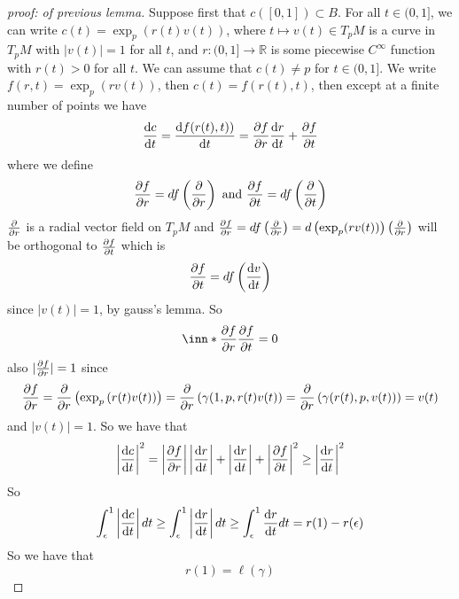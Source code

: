 \documentclass[a4paper]{article}
\begin{document}
\begin{proof}[proof: of previous lemma]
  Suppose first that $c([0,1]) \subset B$. For all $t \in (0,1]$, we can write $c(t) = \exp_p(r(t)v(t))$, where $t \mapsto v(t) \in T_pM$ is a curve in $T_pM$ with $|v(t)| = 1$ for all $t$, and $r: (0,1] \rightarrow \mathds{R}$ is some piecewise $C^{\infty}$ function with $r(t) > 0$ for all $t$. We can assume that $c(t) \neq p$ for $t \in (0,1]$. We write $f(r,t) = \exp_p(r v(t))$, then $c(t) = f(r(t),t)$, then except at a finite number of points we have 
  \[
    \dv{c}{t} = \dv{f(r(t), t))}{t} = \pdv{f}{r}\dv{r}{t} + \pdv{f}{t}
  \]
  where we define
  \[
    \pdv{f}{r} = df \left( \pdv{r} \right) \text{ and }  \pdv{f}{t} = df \left( \pdv{t} \right)
  \]
  $\pdv{r}$ is a radial vector field on $T_pM$ and $\pdv{f}{r} = df \left( \pdv{r} \right) = d\left(\exp_p(r v(t))\right) \left( \pdv{r} \right)$ will be orthogonal to $\pdv{f}{t}$ which is
  \[
    \pdv{f}{t} = df \left( \dv{v}{t} \right)
  \]
  since $|v(t)| = 1$, by gauss's lemma. So
  \[
    \inn*{\pdv{f}{r}}{\pdv{f}{t}} = 0
  \]
  also $|\pdv{f}{r}| = 1$ since 
  \[
    \pdv{f}{r} = \pdv{r} \left( \exp_p \left( r(t) v(t) \right) \right) = \pdv{r} \left( \gamma(1, p, r(t)v(t) \right) = \pdv{r} \left( \gamma(r(t), p, v(t)) \right)  = v(t)
  \]
  and $|v(t)| = 1$. So we have that
  \[
    \left| \dv{c}{t} \right|^2 = \left| \pdv{f}{r} \right| \left| \dv{r}{t} \right| + \left| \dv{r}{t} \right| + \left| \pdv{f}{t} \right|^2 \geq \left| \dv{r}{t} \right|^2
  \]
  So
  \[
    \int_{\epsilon}^1 \left| \dv{c}{t} \right| dt \geq \int_{\epsilon}^1 \left| \dv{r}{t} \right| dt \geq \int_{\epsilon}^1 \dv{r}{t} dt = r(1) - r(\epsilon)
  \]
  So we have that
  \[
    r(1) = \ell(\gamma)
  \]
\end{proof}
  
\end{document}
